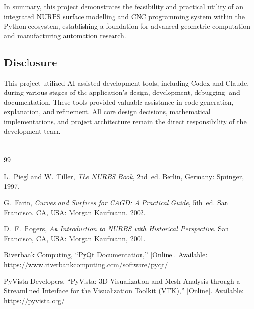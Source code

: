 \documentclass[a4paper,12pt]{article}
\begin{document}
In summary, this project demonstrates the feasibility and practical utility of
an integrated NURBS surface modelling and CNC programming system within the
Python ecosystem, establishing a foundation for advanced geometric computation
and manufacturing automation research.

\subsection*{Disclosure}

This project utilized AI-assisted development tools, including Codex and Claude,
during various stages of the application's design, development, debugging, and
documentation. These tools provided valuable assistance in code generation,
explanation, and refinement. All core design decisions, mathematical implementations,
and project architecture remain the direct responsibility of the development team.

\vspace{4cm}
\section*{}

\begin{thebibliography}{99}

L.~Piegl and W.~Tiller,
\emph{The NURBS Book}, 2nd~ed.
Berlin, Germany: Springer, 1997.

G.~Farin,
\emph{Curves and Surfaces for CAGD: A Practical Guide}, 5th~ed.
San Francisco, CA, USA: Morgan Kaufmann, 2002.

D.~F.~Rogers,
\emph{An Introduction to NURBS with Historical Perspective}.
San Francisco, CA, USA: Morgan Kaufmann, 2001.

Riverbank Computing,
``PyQt Documentation,''
[Online]. Available: https://www.riverbankcomputing.com/software/pyqt/

PyVista Developers,
``PyVista: 3D Visualization and Mesh Analysis through a Streamlined Interface for the Visualization Toolkit (VTK),''
[Online]. Available: https://pyvista.org/

\end{thebibliography}
\end{document}
